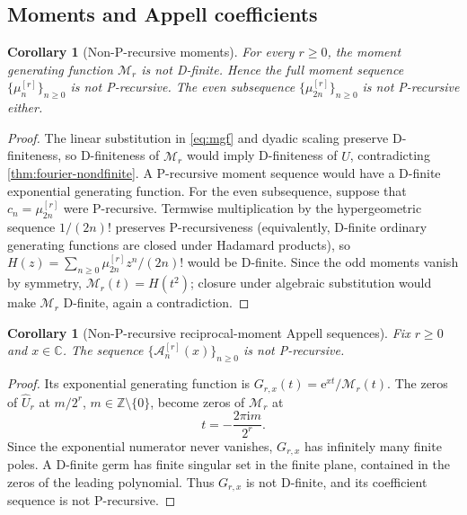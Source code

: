 \documentclass[11pt,oneside]{article}
\newtheorem{corollary}[theorem]{Corollary}
\theoremstyle{definition}
\theoremstyle{remark}
\newcommand{\C}{\mathbb C}
\newcommand{\Z}{\mathbb Z}
\newcommand{\e}{\mathrm e}
\newcommand{\ii}{\mathrm i}
\newcommand{\Acard}{\mathcal A}
\newcommand{\M}{\mathcal M}
\begin{document}
\subsection{Moments and Appell coefficients}
\begin{corollary}[Non-P-recursive moments]
\label{cor:moments-nonP}
For every $r\ge0$, the moment generating function $\M_r$ is not D-finite.  Hence the full moment sequence
$\{\mu_n^{[r]}\}_{n\ge0}$ is not P-recursive.  The even subsequence
$\{\mu_{2n}^{[r]}\}_{n\ge0}$ is not P-recursive either.
\end{corollary}

\begin{proof}
The linear substitution in \eqref{eq:mgf} and dyadic scaling preserve D-finiteness, so D-finiteness of $\M_r$ would imply D-finiteness of $\widehat U$, contradicting \cref{thm:fourier-nondfinite}.  A P-recursive moment sequence would have a D-finite exponential generating function.  For the even subsequence, suppose that $c_n=\mu_{2n}^{[r]}$ were P-recursive.  Termwise multiplication by the hypergeometric sequence $1/(2n)!$ preserves P-recursiveness (equivalently, D-finite ordinary generating functions are closed under Hadamard products), so
$H(z)=\sum_{n\ge0}\mu_{2n}^{[r]}z^n/(2n)!$ would be D-finite.  Since the odd moments vanish by symmetry, $\M_r(t)=H(t^2)$; closure under algebraic substitution would make $\M_r$ D-finite, again a contradiction.
\end{proof}

\begin{corollary}[Non-P-recursive reciprocal-moment Appell sequences]
\label{cor:appell-nonP}
Fix $r\ge0$ and $x\in\C$.  The sequence
$\{\Acard_n^{[r]}(x)\}_{n\ge0}$ is not P-recursive.
\end{corollary}

\begin{proof}
Its exponential generating function is $G_{r,x}(t)=\e^{xt}/\M_r(t)$.  The zeros of $\widehat U_r$ at $m/2^r$, $m\in\Z\setminus\{0\}$, become zeros of $\M_r$ at
\begin{equation}
 t=-\frac{2\pi\ii m}{2^r}.
 \label{eq:mgf-zeros}
\end{equation}
Since the exponential numerator never vanishes, $G_{r,x}$ has infinitely many finite poles.  A D-finite germ has finite singular set in the finite plane, contained in the zeros of the leading polynomial.  Thus $G_{r,x}$ is not D-finite, and its coefficient sequence is not P-recursive.
\end{proof}
\end{document}

